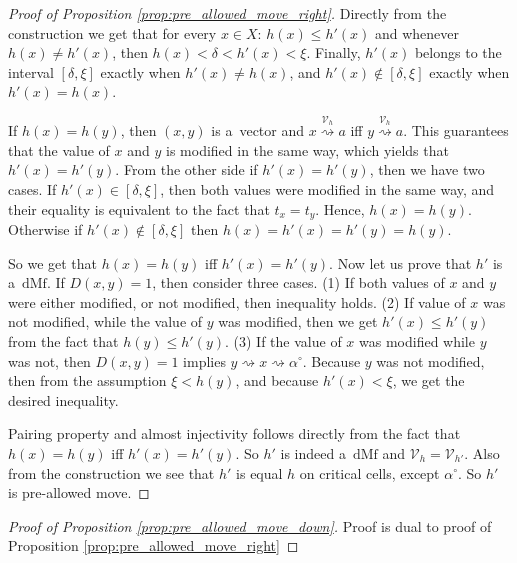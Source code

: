 \documentclass[a4paper,12pt, USenglish,cleveref,autoref,thm-restate]{article}
\newcommand{\mf}{h}
\newcommand{\omf}{h'}
\newcommand{\dmf}{\text{dMf}}
\newcommand{\hmB}{D}
\newcommand{\cx}{x}
\newcommand{\cy}{y}
\newcommand{\ca}{a}
\newcommand{\bth}[1]{#1^\circ}
\newcommand{\bds}{\alpha}
\newcommand{\cV}{\mathcal{V}}
\def\pathh#1{\overset{#1}{\rightsquigarrow}}
\def\pathh#1{\overset{#1}{\rightsquigarrow}}
\begin{document}
\begin{appendices}
\MoveRightProp*

\begin{proof}[Proof of Proposition \ref{prop:pre_allowed_move_right}]
    Directly from the construction we get that for every $x \in X$:  $\mf(x) \leq \omf(x)$ and whenever $\mf(\cx)\neq \omf(\cx)$, then $ \mf(x) < \delta < \omf(x) < \xi$. Finally, $\omf(\cx)$ belongs to the interval $[\delta,\xi]$ exactly when $\omf(\cx)\ne \mf(\cx)$, and $\omf(\cx)\notin[\delta,\xi]$ exactly when $\omf(\cx)=\mf(\cx)$.



 \noindent If $\mf(x)=\mf(y)$, then $(\cx,\cy)$ is a~vector and $\cx \pathh{\cV_{\mf}} a$ iff $y \pathh{\cV_{\mf}} \ca$. This guarantees that the value of $\cx$ and $\cy$ is modified in the same way, which yields that $\omf(\cx) = \omf(\cy)$. From the other side if $\omf(\cx) = \omf(\cy)$, then we have two cases. If $\omf(\cx) \in [\delta,\xi]$, then both values were modified in the same way, and their equality is equivalent to the fact that $t_x = t_y$. Hence, $\mf(\cx) = \mf(\cy)$. Otherwise if $\omf(x) \not\in [\delta,\xi]$ then $\mf(\cx) = \omf(\cx) = \omf(\cy) = \mf(\cy)$.

\noindent So we get that $\mf(\cx)=\mf(\cy)$ iff $\omf(\cx) = \omf(\cy)$. Now let us prove that $\omf$ is a~$\dmf$. If $\hmB(\cx,\cy)=1$, then consider three cases. (1) If both values of $\cx$ and $\cy$ were either modified, or not modified, then inequality holds. (2) If value of $\cx$ was not modified, while the value of $\cy$ was modified, then we get $\omf(\cx) \leq \omf(\cy)$ from the fact that $\mf(\cy) \leq \omf(\cy)$. (3) If the value of $x$ was modified while $y$ was not, then $\hmB(\cx,\cy) = 1$ implies $y \pathh{} x \pathh{} \bth\bds$. Because $\cy$ was not modified, then from the assumption $\xi < \mf(\cy)$, and because $\omf(x) < \xi$, we get the desired inequality.

\noindent Pairing property and almost injectivity follows directly from the fact that $\mf(x) = \mf(y)$ iff $\omf(x) = \omf(y)$. So $\omf$ is indeed a~$\dmf$ and $\cV_{\mf} = \cV_{\omf}$. Also from the construction we see that $\omf$ is equal $\mf$ on critical cells, except $\bth\bds$. So $\omf$ is pre-allowed move.
\end{proof}

\MoveDownProp*

\begin{proof}[Proof of Proposition \ref{prop:pre_allowed_move_down}]
    Proof is dual to proof of Proposition \ref{prop:pre_allowed_move_right}
\end{proof}


\end{appendices}
\end{document}
